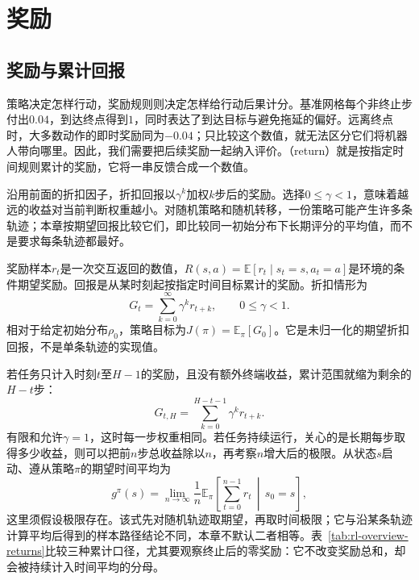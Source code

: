 \section{奖励}
\label{sec:rl-overview-rewards}

\subsection{奖励与累计回报}
\label{sec:rl-overview-return}

策略决定怎样行动，奖励规则则决定怎样给行动后果计分。基准网格每个非终止步付出$0.04$，到达终点得到$1$，同时表达了到达目标与避免拖延的偏好。远离终点时，大多数动作的即时奖励同为$-0.04$；只比较这个数值，就无法区分它们将机器人带向哪里。因此，我们需要把后续奖励一起纳入评价。（return）就是按指定时间规则累计的奖励，它将一串反馈合成一个数值。

沿用前面的折扣因子，折扣回报以$\gamma^k$加权$k$步后的奖励。选择$0\leq\gamma<1$，意味着越远的收益对当前判断权重越小。对随机策略和随机转移，一份策略可能产生许多条轨迹；本章按期望回报比较它们，即比较同一初始分布下长期评分的平均值，而不是要求每条轨迹都最好。

\begin{definition}[回报与策略目标]
  \label{def:rl-overview-return}
  奖励样本$r_t$是一次交互返回的数值，$R(s,a)=\mathbb E[r_t\mid s_t=s,a_t=a]$是环境的条件期望奖励。回报是从某时刻起按指定时间目标累计的奖励。折扣情形为
  \begin{equation}
    G_t=\sum_{k=0}^{\infty}\gamma^k r_{t+k},
    \qquad 0\leq\gamma<1.
    \label{eq:rl-overview-return}
  \end{equation}
  相对于给定初始分布$\rho_0$，策略目标为$J(\pi)=\mathbb E_\pi[G_0]$。它是未归一化的期望折扣回报，不是单条轨迹的实现值。
\end{definition}

若任务只计入时刻$t$至$H-1$的奖励，且没有额外终端收益，累计范围就缩为剩余的$H-t$步：
\[
  G_{t,H}=\sum_{k=0}^{H-t-1}\gamma^k r_{t+k}.
\]
有限和允许$\gamma=1$，这时每一步权重相同。若任务持续运行，关心的是长期每步取得多少收益，则可以把前$n$步总收益除以$n$，再考察$n$增大后的极限。从状态$s$启动、遵从策略$\pi$的期望时间平均为
\[
  g^\pi(s)=\lim_{n\to\infty}\frac{1}{n}
    \mathbb E_\pi\left[\sum_{t=0}^{n-1}r_t\,\middle|\,s_0=s\right],
\]
这里须假设极限存在。该式先对随机轨迹取期望，再取时间极限；它与沿某条轨迹计算平均后得到的样本路径结论不同，本章不默认二者相等。表~\ref{tab:rl-overview-returns}比较三种累计口径，尤其要观察终止后的零奖励：它不改变奖励总和，却会被持续计入时间平均的分母。


